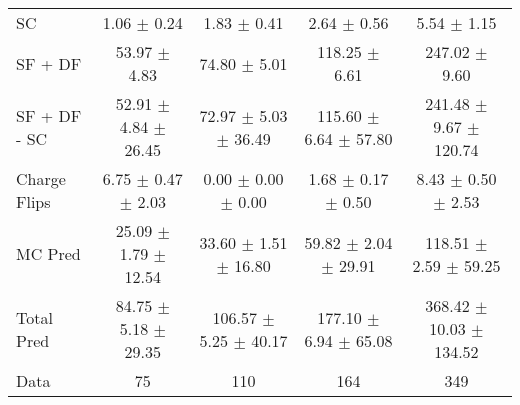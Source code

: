 \begin{tabular}{l|cccc}
                                 SC &  1.06 $\pm$  0.24 &  1.83 $\pm$  0.41 &  2.64 $\pm$  0.56 &  5.54 $\pm$  1.15 \\
                            SF + DF & 53.97 $\pm$  4.83 & 74.80 $\pm$  5.01 & 118.25 $\pm$  6.61 & 247.02 $\pm$  9.60 \\
\hline
                       SF + DF - SC & 52.91 $\pm$  4.84 $\pm$ 26.45 & 72.97 $\pm$  5.03 $\pm$ 36.49 & 115.60 $\pm$  6.64 $\pm$ 57.80 & 241.48 $\pm$  9.67 $\pm$ 120.74 \\
\hline\hline
                       Charge Flips &  6.75 $\pm$  0.47 $\pm$  2.03 &  0.00 $\pm$  0.00 $\pm$  0.00 &  1.68 $\pm$  0.17 $\pm$  0.50 &  8.43 $\pm$  0.50 $\pm$  2.53 \\
\hline
                            MC Pred & 25.09 $\pm$  1.79 $\pm$ 12.54 & 33.60 $\pm$  1.51 $\pm$ 16.80 & 59.82 $\pm$  2.04 $\pm$ 29.91 & 118.51 $\pm$  2.59 $\pm$ 59.25 \\
\hline
                         Total Pred & 84.75 $\pm$  5.18 $\pm$ 29.35 & 106.57 $\pm$  5.25 $\pm$ 40.17 & 177.10 $\pm$  6.94 $\pm$ 65.08 & 368.42 $\pm$ 10.03 $\pm$ 134.52 \\
\hline\hline
                               Data &    75 &   110 &   164 &   349 \\
\hline\hline
\end{tabular}

